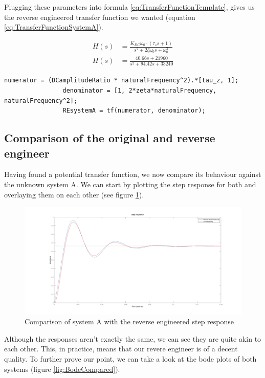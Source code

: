 \documentclass[a4paper,kul]{kulakarticle} %
\begin{document}
			Plugging these parameters into formula \ref{eq:TransferFunctionTemplate}, gives us the reverse engineered transfer function we wanted (equation \ref{eq:TransferFunctionSystemA}). 
			
			\begin{align}
				\label{eq:TransferFunctionTemplate}
				H(s)&=\frac{K_{DC}\omega_0\cdot(\tau_zs+1)}{s^2+2\zeta\omega_0s+\omega_0^2}\\
				\label{eq:TransferFunctionSystemA}
				H(s)&= \frac{40.66s + 21960}{s^2+94.42s+33240}
			\end{align}
			
			\begin{lstlisting}[style=Matlab-editor]
				numerator = (DCamplitudeRatio * naturalFrequency^2).*[tau_z, 1];
				denominator = [1, 2*zeta*naturalFrequency, naturalFrequency^2];
				REsystemA = tf(numerator, denominator);
			\end{lstlisting}
		
		\newpage	
		\subsection{Comparison of the original and reverse engineer}
			Having found a potential transfer function, we now compare its behaviour against the unknown system A. We can start by plotting the step response for both and overlaying them on each other (see figure \ref{fig:StepCompared}).\\ 
			
			\begin{figure}[h]
				\centering
				\includegraphics[width=1\linewidth]{StepCompared}
				\caption[Comparing step responses]{Comparison of system A with the reverse engineered step response}
				\label{fig:StepCompared}
			\end{figure}
			
			Although the responses aren't exactly the same, we can see they are quite akin to each other. This, in practice, means that our revere engineer is of a decent quality. To further prove our point, we can take a look at the bode plots of both systems (figure \ref{fig:BodeCompared}). 
			
\end{document}
